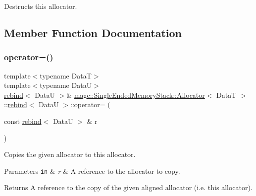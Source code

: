 Destructs this allocator. 

\subsection{Member Function Documentation}
\hypertarget{structmage_1_1_single_ended_memory_stack_1_1_allocator_1_1rebind_a4d720811d1c58d5b5eb0d7316f8c5f3a}{}\label{structmage_1_1_single_ended_memory_stack_1_1_allocator_1_1rebind_a4d720811d1c58d5b5eb0d7316f8c5f3a} 
\subsubsection{\texorpdfstring{operator=()}{operator=()}\hspace{0.1cm}{\footnotesize\ttfamily [1/2]}}
{\footnotesize\ttfamily template$<$typename DataT$>$ \\
template$<$typename DataU$>$ \\
\hyperlink{structmage_1_1_single_ended_memory_stack_1_1_allocator_1_1rebind}{rebind}$<$ DataU $>$\& \hyperlink{structmage_1_1_single_ended_memory_stack_1_1_allocator}{mage\+::\+Single\+Ended\+Memory\+Stack\+::\+Allocator}$<$ DataT $>$\+::\hyperlink{structmage_1_1_single_ended_memory_stack_1_1_allocator_1_1rebind}{rebind}$<$ DataU $>$\+::operator= (\begin{DoxyParamCaption}\item[{const \hyperlink{structmage_1_1_single_ended_memory_stack_1_1_allocator_1_1rebind}{rebind}$<$ DataU $>$ \&}]{r }\end{DoxyParamCaption})\hspace{0.3cm}{\ttfamily [delete]}}

Copies the given allocator to this allocator.


\begin{DoxyParams}[1]{Parameters}
\mbox{\tt in}  & {\em r} & A reference to the allocator to copy. \\
\hline
\end{DoxyParams}
\begin{DoxyReturn}{Returns}
A reference to the copy of the given aligned allocator (i.\+e. this allocator). 
\end{DoxyReturn}
\hypertarget{structmage_1_1_single_ended_memory_stack_1_1_allocator_1_1rebind_a429bbc7cc8ebca81225731385729f2ff}{}\label{structmage_1_1_single_ended_memory_stack_1_1_allocator_1_1rebind_a429bbc7cc8ebca81225731385729f2ff} 
